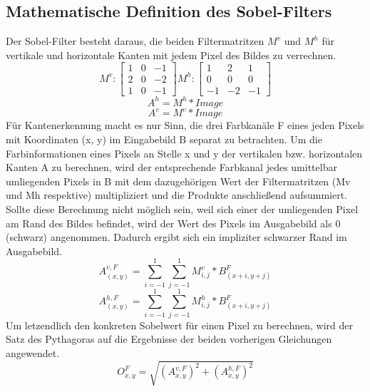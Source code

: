 \documentclass[course=erap]{aspdoc}
\begin{document}
\subsection{Mathematische Definition des Sobel-Filters}
\label{sec:math-def}
Der Sobel-Filter besteht daraus, die beiden Filtermatritzen $M^{v}$ und $M^{h}$ für vertikale und horizontale Kanten mit jedem Pixel des Bildes zu verrechnen.
\begin{equation}
    M^{v} :
    \begin{bmatrix}
        1 & 0 & -1 \\
        2 & 0 & -2 \\
        1 & 0 & -1
    \end{bmatrix}
    M^{h} :
    \begin{bmatrix}
        1 & 2 & 1 \\
        0 & 0 & 0 \\
        -1 & -2 & -1
    \end{bmatrix}
\end{equation}
\begin{equation}
    A^{h} = M^{h} * Image
\end{equation}
\begin{equation}
    A^{v} = M^{v} * Image
\end{equation}
Für Kantenerkennung macht es nur Sinn, die drei Farbkanäle F eines jeden Pixels mit Koordinaten (x, y) im Eingabebild B separat zu betrachten.
Um die Farbinformationen eines Pixels an Stelle x und y der vertikalen bzw. horizontalen Kanten A zu berechnen, wird der entsprechende Farbkanal jedes umittelbar umliegenden Pixels in B mit dem dazugehörigen Wert der Filtermatritzen (Mv und Mh respektive) multipliziert und die Produkte anschließend aufsummiert.
Sollte diese Berechnung nicht möglich sein, weil sich einer der umliegenden Pixel am Rand des Bildes befindet, wird der Wert des Pixels im Ausgabebild als 0 (schwarz) angenommen.
Dadurch ergibt sich ein impliziter schwarzer Rand im Ausgabebild.
\begin{equation}
    A_(x,y)^{v,F} = \sum_{i=-1}^{1} \sum_{j=-1}^{1} M^{v}_{i,j} * B_{(x+i,y+j)}^{F}
\end{equation}
\begin{equation}
    A_(x,y)^{h,F} = \sum_{i=-1}^{1} \sum_{j=-1}^{1} M^{h}_{i,j} * B_{(x+i,y+j)}^{F}
\end{equation}
Um letzendlich den konkreten Sobelwert für einen Pixel zu berechnen, wird der Satz des Pythagoras auf die Ergebnisse der beiden vorherigen Gleichungen angewendet.
\begin{equation}
    O^{F}_{x,y} = \sqrt{(A^{v,F}_{x,y})^2 + (A^{h,F}_{x,y})^2}
    \label{eq:wurzel}
\end{equation}
\end{document}
